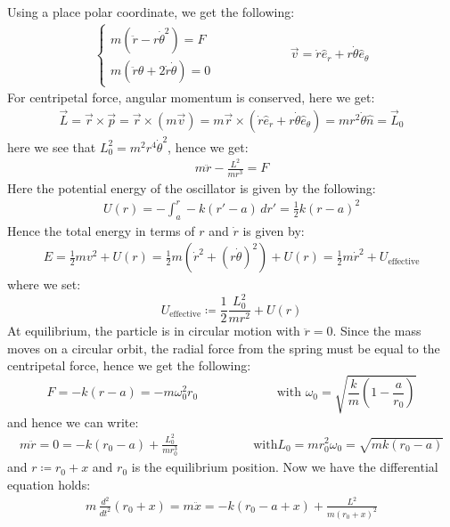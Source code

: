 \documentclass[11pt,oneside]{book}
\theoremstyle{break}
\theoremstyle{break}
\begin{document}
Using a place polar coordinate, we get the following:
\begin{align*}
\begin{cases}
m(\ddot{r} - r\dot{\theta}^2) = F\\
m(\ddot{r}\theta+2\dot{r}\dot{\theta}) = 0
\end{cases} \qquad\qquad\qquad \vec{v} = \dot{r}\hat{e}_r + r\dot{\theta} \hat{e}_{\theta}
\end{align*}
For centripetal force, angular momentum is conserved, here we get:
\begin{align*}
\vec{L} = \vec{r}\times \vec{p} = \vec{r}\times (m\vec{v}) = m\vec{r}\times (\dot{r}\hat{e}_r + r\dot{\theta} \hat{e}_{\theta}) = mr^2\dot{\theta}\hat{n} = \vec{L}_0
\end{align*}
here we see that $L_0^2 = m^2 r^4 \dot{\theta}^2$, hence we get:
\begin{align*}
m\ddot{r} - \frac{L^2}{mr^3} = F
\end{align*}
Here the potential energy of the oscillator is given by the following:
\begin{align*}
U(r) = -\int_a^r -k(r'-a)\, dr' = \frac{1}{2}k(r-a)^2
\end{align*}
Hence the total energy in terms of $r$ and $\dot{r}$ is given by:
\begin{align*}
E = \frac{1}{2}mv^2 +U(r) = \frac{1}{2}m (\dot{r}^2+(r\dot{\theta})^2) + U(r) = \frac{1}{2}m\dot{r}^2 + U_{\text{effective}}
\end{align*}
where we set:
$$U_{\text{effective}} \coloneqq \frac{1}{2}\frac{L_0^2}{mr^2}+U(r)$$
At equilibrium, the particle is in circular motion with $\ddot{r} = 0$. Since the mass moves on a circular orbit, the radial force from the spring must be equal to the centripetal force, hence we get the following:
$$F = -k(r-a) = -m\omega_0^2 r_0\qquad\qquad\qquad\text{ with }\omega_0 = \sqrt{\frac{k}{m}\left(1- \frac{a}{r_0}\right)}$$
and hence we can write:
\begin{align*}
m\ddot{r} = 0 = -k(r_0-a) + \frac{L_0^2}{mr_0^3}\qquad\qquad\qquad \text{with}L_0 = mr_0^2\omega_0 = \sqrt{mk(r_0-a)}
\end{align*}
and $r \coloneqq r_0 + x$ and $r_0$ is the equilibrium position. Now we have the differential equation holds:
\begin{align*}
m \, \frac{d^2}{dt^2}(r_0+x) = m \ddot{x} = -k(r_0-a+x) + \frac{L^2}{m(r_0+x)^2}
\end{align*}
\end{document}
